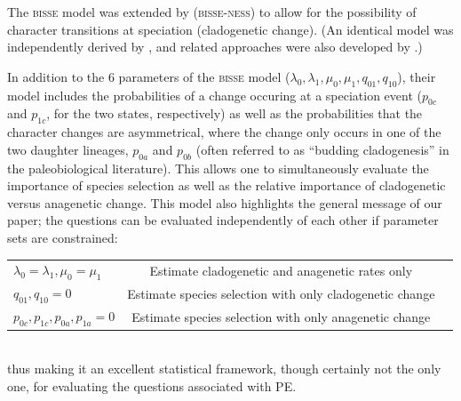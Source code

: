 The \textsc{bisse} model was extended by \citet{MagnusonFord2012} (\textsc{bisse-ness}) to allow for the possibility of character transitions at speciation (cladogenetic change). (An identical model was independently derived by \citealt{Goldberg2012}, and related approaches were also developed by \citealt{Bokma2002, Bokma2008, Bokma2010}.) 


In addition to the 6 parameters of the \textsc{bisse} model ($\lambda_0, \lambda_1, \mu_0, \mu_1, q_{01}, q_{10}$), their model includes the probabilities of a change occuring at a speciation event ($p_{0c}$ and $p_{1c}$, for the two states, respectively) as well as the probabilities that the character changes are asymmetrical, where the change only occurs in one of the two daughter lineages, $p_{0a}$ and $p_{0b}$ (often referred to as ``budding cladogenesis'' in the paleobiological literature). This allows one to simultaneously evaluate the importance of species selection as well as the relative importance of cladogenetic versus anagenetic change. This model also highlights the general message of our paper; the questions can be evaluated independently of each other if parameter sets are constrained:

\begin{tabular}{ l c r }
  $\lambda_0 = \lambda_1, \mu_0 = \mu_1$ & Estimate cladogenetic and anagenetic rates only \\
  $q_{01}, q_{10} = \text{0}$ & Estimate species selection with only cladogenetic change \\
  $p_{0c}, p_{1c}, p_{0a}, p_{1a} = \text{0}$ & Estimate species selection with only anagenetic change\\
\end{tabular}\\

thus making it an excellent statistical framework, though certainly not the only one, for evaluating the questions associated with PE.


